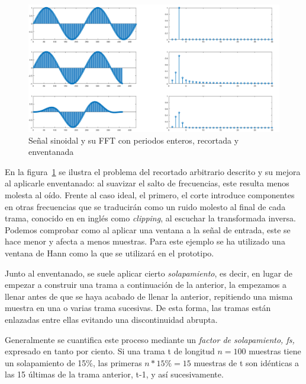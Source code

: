 \begin{figure}[!ht]
\begin{center}
\includegraphics[width=14cm]{img/problem_fft.png}
\caption{\label{fig:probfft}Señal sinoidal y su FFT con periodos enteros, recortada y enventanada}
\end{center}
\end{figure}

En la figura~\ref{fig:probfft} se ilustra el problema del recortado arbitrario descrito y su mejora al aplicarle enventanado: al suavizar el salto de frecuencias, este resulta menos molesta al oído. Frente al caso ideal, el primero, el corte introduce componentes en otras frecuencias que se traducirán como un ruido molesto al final de cada trama, conocido en en inglés como \emph{clipping}, al escuchar la transformada inversa. Podemos comprobar como al aplicar una ventana a la señal de entrada, este se hace menor y afecta a menos muestras. Para este ejemplo se ha utilizado una ventana de Hann como la que se utilizará en el prototipo.

Junto al enventanado, se suele aplicar cierto \emph{solapamiento}, es decir, en lugar de empezar a construir una trama a continuación de la anterior, la empezamos a llenar antes de que se haya acabado de llenar la anterior, repitiendo una misma muestra en una o varias trama sucesivas. De esta forma, las tramas están enlazadas entre ellas evitando una discontinuidad abrupta.

Generalmente se cuantifica este proceso mediante un \emph{factor de solapamiento, fs,} expresado en tanto por ciento. Si una trama t de longitud $n = 100$ muestras tiene un solapamiento de 15\%, las primeras $n*15\% = 15$ muestras de t son idénticas a las 15 últimas de la trama anterior, t-1, y así sucesivamente.

